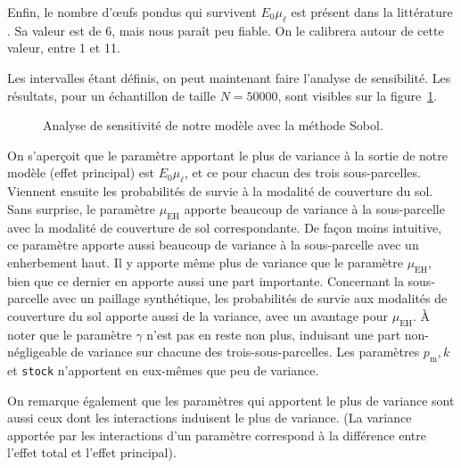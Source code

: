 Enfin, le nombre d'œufs pondus qui survivent $E_0\mu_\ell$ est présent dans la littérature \citep{paul}.
Sa valeur est de 6, mais nous paraît peu fiable.
On le calibrera autour de cette valeur, entre 1 et 11.

Les intervalles étant définis, on peut maintenant faire l'analyse de sensibilité. Les résultats, pour un échantillon de taille $N = 50000$, sont visibles sur la figure~\ref{fig:sa}.

\begin{figure}
 \centering
 \caption{Analyse de sensitivité de notre modèle avec la méthode Sobol.}
 \label{fig:sa}
\end{figure}

On s'aperçoit que le paramètre apportant le plus de variance à la sortie de notre modèle (effet principal) est $E_0\mu_\ell$, et ce pour chacun des trois sous-parcelles.
Viennent ensuite les probabilités de survie à la modalité de couverture du sol.
Sans surprise, le paramètre $\mu_{\text{EH}}$ apporte beaucoup de variance à la sous-parcelle avec la modalité de couverture de sol correspondante.
De façon moins intuitive, ce paramètre apporte aussi beaucoup de variance à la sous-parcelle avec un enherbement haut.
Il y apporte même plus de variance que le paramètre $\mu_{\text{EH}}$, bien que ce dernier en apporte aussi une part importante.
Concernant la sous-parcelle avec un paillage synthétique, les probabilités de survie aux modalités de couverture du sol apporte aussi de la variance, avec un avantage pour $\mu_{\text{EH}}$.
À noter que le paramètre $\gamma$ n'est pas en reste non plus, induisant une part non-négligeable de variance sur chacune des trois-sous-parcelles.
Les paramètres $p_{\text{m}}, k$ et \texttt{stock} n'apportent en eux-mêmes que peu de variance.

On remarque également que les paramètres qui apportent le plus de variance sont aussi ceux dont les interactions induisent le plus de variance. (La variance apportée par les interactions d'un paramètre correspond à la différence entre l'effet total et l'effet principal).


